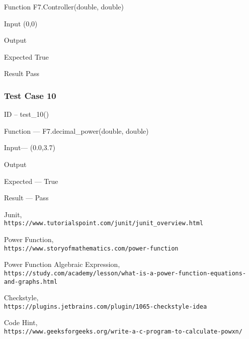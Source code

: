 \documentclass[a4paper,12pt]{article}
\begin{document}
Function \to F7.Controller(double, double)

Input \to (0,0)

Output 

Expected \to True

Result \to Pass


\subsubsection{\textbf{Test Case 10}}

ID  --   test\_10()

Function --- F7.decimal\_power(double, double)

Input--- (0.0,3.7)

Output 

Expected --- True

Result --- Pass

\begin{thebibliography}{9}
    Junit,
    \\\texttt{https://www.tutorialspoint.com/junit/junit_overview.html}

    Power Function,
    \\\texttt{https://www.storyofmathematics.com/power-function}


    Power Function Algebraic Expression,
    \\\texttt{https://study.com/academy/lesson/what-is-a-power-function-equations-and-graphs.html}

    Checkstyle,
    \\\texttt{https://plugins.jetbrains.com/plugin/1065-checkstyle-idea}
    
    Code Hint,
    \\\texttt{https://www.geeksforgeeks.org/write-a-c-program-to-calculate-powxn/}
    \end{thebibliography}
\end{document}
